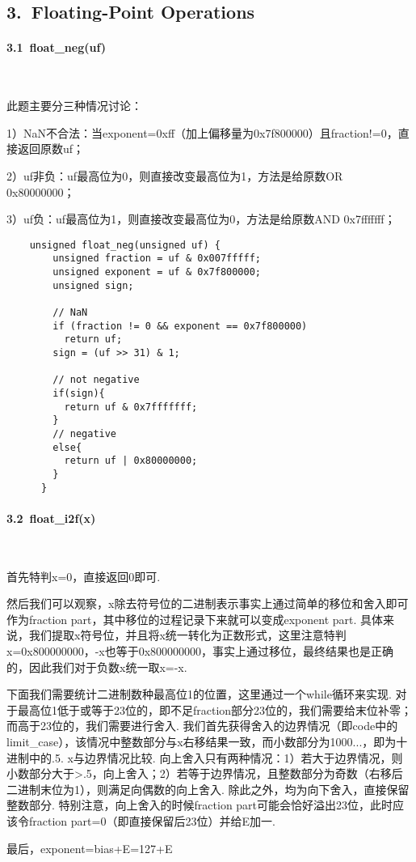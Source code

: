 \documentclass[UTF8]{ctexart}
\begin{document}
\subsection*{3.\ Floating-Point Operations}
\paragraph*{3.1\ float\_neg(uf)}\ \par
此题主要分三种情况讨论：\par
1）NaN不合法：当exponent=0xff（加上偏移量为0x7f800000）且fraction!=0，直接返回原数uf；\par
2）uf非负：uf最高位为0，则直接改变最高位为1，方法是给原数OR 0x80000000；\par
3）uf负：uf最高位为1，则直接改变最高位为0，方法是给原数AND 0x7fffffff；\par
\begin{lstlisting}
    unsigned float_neg(unsigned uf) {
        unsigned fraction = uf & 0x007fffff;
        unsigned exponent = uf & 0x7f800000;
        unsigned sign;
      
        // NaN
        if (fraction != 0 && exponent == 0x7f800000)
          return uf; 
        sign = (uf >> 31) & 1;
      
        // not negative
        if(sign){
          return uf & 0x7fffffff;
        }
        // negative
        else{
          return uf | 0x80000000;
        }
      }
\end{lstlisting}

\paragraph*{3.2\ float\_i2f(x)}\ \par
首先特判x=0，直接返回0即可. \par
然后我们可以观察，x除去符号位的二进制表示事实上通过简单的移位和舍入即可作为fraction part，其中移位的过程记录下来就可以变成exponent part. 具体来说，我们提取x符号位，并且将x统一转化为正数形式，这里注意特判x=0x800000000，-x也等于0x800000000，事实上通过移位，最终结果也是正确的，因此我们对于负数x统一取x=-x.\par 下面我们需要统计二进制数种最高位1的位置，这里通过一个while循环来实现. 对于最高位1低于或等于23位的，即不足fraction部分23位的，我们需要给末位补零；而高于23位的，我们需要进行舍入. 我们首先获得舍入的边界情况（即code中的limit\_case），该情况中整数部分与x右移结果一致，而小数部分为1000...，即为十进制中的.5. x与边界情况比较. 向上舍入只有两种情况：1）若大于边界情况，则小数部分大于>.5，向上舍入；2）若等于边界情况，且整数部分为奇数（右移后二进制末位为1），则满足向偶数的向上舍入. 除此之外，均为向下舍入，直接保留整数部分. 特别注意，向上舍入的时候fraction part可能会恰好溢出23位，此时应该令fraction part=0（即直接保留后23位）并给E加一.\par
最后，exponent=bias+E=127+E
\end{document}
